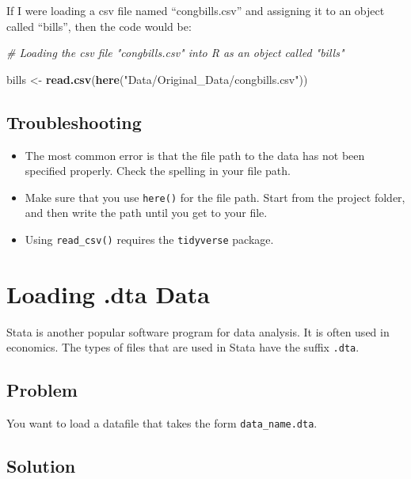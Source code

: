 \documentclass[
]{book}
\newenvironment{Shaded}{\begin{snugshade}}{\end{snugshade}}
\newcommand{\CommentTok}[1]{\textcolor[rgb]{0.56,0.35,0.01}{\textit{#1}}}
\newcommand{\FunctionTok}[1]{\textcolor[rgb]{0.13,0.29,0.53}{\textbf{#1}}}
\newcommand{\NormalTok}[1]{#1}
\newcommand{\OtherTok}[1]{\textcolor[rgb]{0.56,0.35,0.01}{#1}}
\newcommand{\StringTok}[1]{\textcolor[rgb]{0.31,0.60,0.02}{#1}}
\providecommand{\tightlist}{%
  \setlength{\itemsep}{0pt}\setlength{\parskip}{0pt}}
\begin{document}
If I were loading a csv file named ``congbills.csv'' and assigning it to an object called ``bills'', then the code would be:

\begin{Shaded}
\begin{Highlighting}[]
\CommentTok{\# Loading the csv file "congbills.csv" into R as an object called "bills"}

\NormalTok{bills }\OtherTok{\textless{}{-}} \FunctionTok{read.csv}\NormalTok{(}\FunctionTok{here}\NormalTok{(}\StringTok{"Data/Original\_Data/congbills.csv"}\NormalTok{))}
\end{Highlighting}
\end{Shaded}

\hypertarget{troubleshooting-7}{%
\subsection{Troubleshooting}\label{troubleshooting-7}}

\begin{itemize}
\tightlist
\item
  The most common error is that the file path to the data has not been specified properly. Check the spelling in your file path.
\item
  Make sure that you use \texttt{here()} for the file path. Start from the project folder, and then write the path until you get to your file.
\item
  Using \texttt{read\_csv()} requires the \texttt{tidyverse} package.
\end{itemize}

\hypertarget{dta-load}{%
\section{Loading .dta Data}\label{dta-load}}

Stata is another popular software program for data analysis. It is often used in economics. The types of files that are used in Stata have the suffix \texttt{.dta}.

\hypertarget{problem-10}{%
\subsection{Problem}\label{problem-10}}

You want to load a datafile that takes the form \texttt{data\_name.dta}.

\hypertarget{solution-10}{%
\subsection{Solution}\label{solution-10}}
\end{document}
